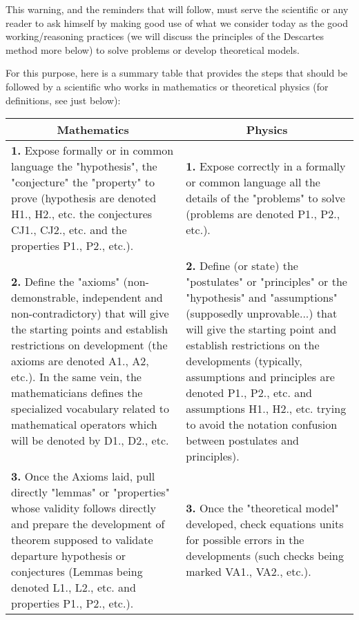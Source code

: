 	This warning, and the reminders that will follow, must serve the scientific or any reader to ask himself by making good use of what we consider today as the good working/reasoning practices (we will discuss the principles of the Descartes method more below) to solve problems or develop theoretical models.

\pagebreak
For this purpose, here is a summary table that provides the steps that should be followed by a scientific who works in mathematics or theoretical physics (for definitions, see just below):

	\begin{table}[!ht]
	\begin{center}
			\begin{tabular}{|p{7.5cm}|p{7.5cm}|}
				\hline
				\multicolumn{1}{c}{\cellcolor{black!30}\textbf{Mathematics}} & 
  \multicolumn{1}{c}{\cellcolor{black!30}\textbf{Physics}} \\ \hline
				\textbf{1.} Expose formally or in common language the "hypothesis", the "conjecture" the "property" to prove (hypothesis are denoted H1., H2., etc. the conjectures CJ1., CJ2., etc. and the properties P1., P2., etc.). & \textbf{1.} Expose correctly in a formally or common language all the details of the "problems" to solve (problems are denoted P1., P2., etc.). \\ \hline
				\textbf{2.} Define the "axioms" (non-demonstrable, independent and non-contradictory) that will give the starting points and establish restrictions on development (the axioms are denoted A1., A2, etc.)\footnotemark. \newline\newline
In the same vein, the mathematicians defines the specialized vocabulary related to mathematical operators which will be denoted by D1., D2., etc. & \textbf{2.} Define (or state) the "postulates" or "principles" or the "hypothesis" and "assumptions" (supposedly unprovable...) that will give the starting point and establish restrictions on the developments (typically, assumptions and principles are denoted P1., P2., etc. and assumptions H1., H2., etc. trying to avoid the notation confusion between postulates and principles)\footnotemark. \\ \hline
				\textbf{3.} Once the Axioms laid, pull directly "lemmas" or "properties" whose validity follows directly and prepare the development of theorem supposed to validate departure hypothesis or conjectures (Lemmas being denoted L1., L2., etc. and properties P1., P2., etc.). & \textbf{3.} Once the "theoretical model" developed, check equations units for possible errors in the developments (such checks being marked VA1., VA2., etc.).\\ \hline

\end{tabular}
\end{center}
\end{table}

